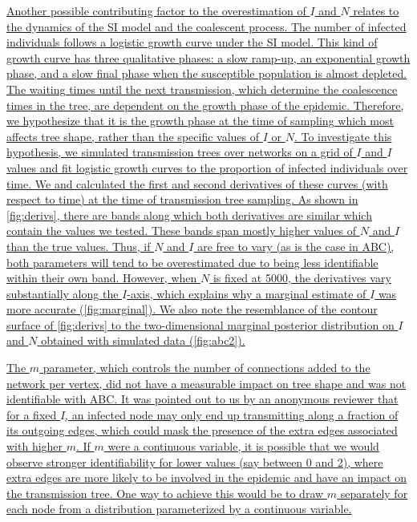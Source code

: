\documentclass[12pt]{article}\usepackage[]{graphicx}\usepackage[]{color}
\let\mref\cref
\renewcommand{\cref}[1]{\mbox{\mref{#1}}}
\newcommand{\add}[1]{\color{blue} \uline{#1} \color{black}}
\begin{document}
\add{Another possible contributing factor to the overestimation of $I$ and $N$
relates to the dynamics of the SI model and the coalescent process. The number
of infected individuals follows a logistic growth curve under the SI model.
This kind of growth curve has three qualitative phases: a slow ramp-up, an
exponential growth phase, and a slow final phase when the susceptible
population is almost depleted. The waiting times until the next transmission,
which determine the coalescence times in the tree, are dependent on the growth
phase of the epidemic. Therefore, we hypothesize that it is the growth phase at
the time of sampling which most affects tree shape, rather than the specific
values of $I$ or $N$. To investigate this hypothesis, we simulated transmission
trees over networks on a grid of $I$ and $I$ values and fit logistic growth
curves to the proportion of infected individuals over time. We and calculated
the first and second derivatives of these curves (with respect to time) at the
time of transmission tree sampling. As shown in \cref{fig:derivs}, there are
bands along which both derivatives are similar which contain the values we
tested. These bands span mostly higher values of $N$ and $I$ than the true
values. Thus, if $N$ and $I$ are free to vary (as is the case in ABC), both
parameters will tend to be overestimated due to being less identifiable within
their own band. However, when $N$ is fixed at 5000, the derivatives vary
substantially along the $I$-axis, which explains why a marginal estimate of $I$
was more accurate (\cref{fig:marginal}). We also note the resemblance of the
contour surface of \cref{fig:derivs} to the two-dimensional marginal posterior
distribution on $I$ and $N$ obtained with simulated data (\cref{fig:abc2}).}

\add{The $m$ parameter, which controls the number of connections added to the
network per vertex, did not have a measurable impact on tree shape and was not
identifiable with ABC. It was pointed out to us by an anonymous reviewer that
for a fixed $I$, an infected node may only end up transmitting along a fraction
of its outgoing edges, which could mask the presence of the extra edges
associated with higher $m$. If $m$ were a continuous variable, it is possible
that we would observe stronger identifiability for lower values (say between 0
and 2), where extra edges are more likely to be involved in the epidemic and
have an impact on the transmission tree. One way to achieve this would be to
draw $m$ separately for each node from a distribution parameterized by a
continuous variable.}
\end{document}
